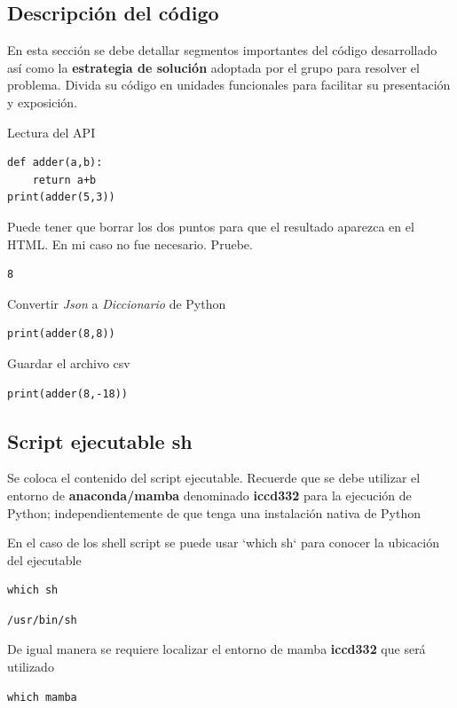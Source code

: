 \documentclass{article}
\begin{document}
\subsection{Descripción del código}
\label{sec:orged70302}
En esta sección se debe detallar segmentos importantes del código
desarrollado así como la \textbf{\textbf{estrategia de solución}} adoptada por el
grupo para resolver el problema. Divida su código en unidades
funcionales para facilitar su presentación y exposición.

Lectura del API
\begin{verbatim}
def adder(a,b):
    return a+b
print(adder(5,3))
\end{verbatim}

Puede tener que borrar los dos puntos para que el resultado aparezca
en el HTML. En mi caso no fue necesario. Pruebe.
\label{orge1b55a9}
\begin{verbatim}
8
\end{verbatim}


Convertir \emph{Json} a \emph{Diccionario} de Python
\begin{verbatim}
print(adder(8,8))
\end{verbatim}


Guardar el archivo csv
\begin{verbatim}
print(adder(8,-18))
\end{verbatim}
\subsection{Script ejecutable sh}
\label{sec:orgac6354d}
Se coloca el contenido del script ejecutable. Recuerde que se debe
utilizar el entorno de \textbf{\textbf{anaconda/mamba}} denominado \textbf{\textbf{iccd332}} para
la ejecución de Python; independientemente de que tenga una
instalación nativa de Python

En el caso de los shell script se puede usar `which sh` para conocer
la ubicación del ejecutable
\begin{verbatim}
which sh
\end{verbatim}

\label{orgea4cea0}
\begin{verbatim}
/usr/bin/sh
\end{verbatim}


De igual manera se requiere localizar el entorno de mamba \textbf{iccd332}
que será utilizado

\begin{verbatim}
which mamba
\end{verbatim}
\end{document}
